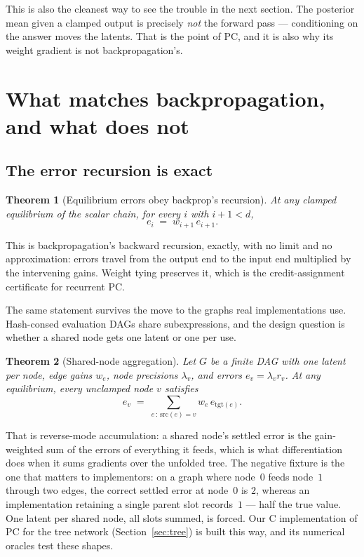\documentclass[11pt]{article}
\newtheorem{theorem}{Theorem}[section]
\begin{document}
This is also the cleanest way to see the trouble in the next section. The posterior mean
given a clamped output is precisely \emph{not} the forward pass --- conditioning on the
answer moves the latents. That is the point of PC, and it is also why its weight gradient
is not backpropagation's.

\section{What matches backpropagation, and what does not}

\subsection{The error recursion is exact}

\begin{theorem}[Equilibrium errors obey backprop's recursion]\label{thm:errrec}
At any clamped equilibrium of the scalar chain, for every $i$ with $i+1 < d$,
\[
e_i \;=\; w_{i+1}\, e_{i+1}.
\]
\end{theorem}

This is backpropagation's backward recursion, exactly, with no limit and no
approximation: errors travel from the output end to the input end multiplied by the
intervening gains. Weight tying preserves it, which is the credit-assignment certificate
for recurrent PC.

The same statement survives the move to the graphs real implementations use. Hash-consed
evaluation DAGs share subexpressions, and the design question is whether a shared node
gets one latent or one per use.

\begin{theorem}[Shared-node aggregation]\label{thm:dagrec}
Let $G$ be a finite DAG with one latent per node, edge gains $w_e$, node precisions
$\lambda_v$, and errors $e_v = \lambda_v r_v$. At any equilibrium, every unclamped node
$v$ satisfies
\[
e_v \;=\; \sum_{e\,:\,\mathrm{src}(e) = v} w_e\, e_{\mathrm{tgt}(e)} .
\]
\end{theorem}

That is reverse-mode accumulation: a shared node's settled error is the gain-weighted
sum of the errors of everything it feeds, which is what differentiation does when it
sums gradients over the unfolded tree. The negative fixture is the one that matters to
implementors: on a graph where node~$0$ feeds node~$1$ through two edges, the correct
settled error at node~$0$ is $2$, whereas an implementation retaining a single parent
slot records~$1$ --- half the true value. One latent per shared node, all slots summed,
is forced. Our C implementation of PC for the tree network (Section~\ref{sec:tree}) is
built this way, and its numerical oracles test these shapes.
\end{document}
